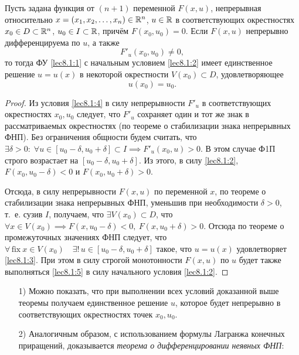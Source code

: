 \documentclass[../../main.tex]{subfiles}
\begin{document}
	 \begin{thm}
		Пусть задана функция от $(n+1)$ переменной $F(x, u)$, непрерывная 
		относительно $x = (x_1, x_2, \ldots,
	 	x_n) \in \mathbb{R}^n$, $u \in \mathbb{R}$ в соответствующих окрестностях $x_0 \in D 
	 	\subset \mathbb{R}^n$, $u_0 \in I \subset \mathbb{R}$, причём $F(x_0,u_0)=0$. Если $F(x,u)$ 
	 	непрерывно дифференцируема по $u$, а также 
		\begin{equation}
			F'_u(x_0, u_0) \ne 0, \label{lec8.1:4}
		\end{equation}
		то тогда ФУ \eqref{lec8.1:1} с начальным условием \eqref{lec8.1:2} имеет 
		единственное решение $u = u(x)$ в некоторой окрестности $V(x_0) 
		\subset D$, удовлетворяющее
	 	\begin{equation}
			u(x_0) = u_0. \label{lec8.1:5}
		\end{equation}
	 \end{thm}
	 \begin{proof}
		 Из условия \eqref{lec8.1:4} в силу непрерывности $F'_u$ в 
		 соответствующих окрестностях $x_0, u_0$ следует, что $F'_u$ сохраняет 
		 один и тот же знак в рассматриваемых окрестностях (по теореме о 
		 стабилизации знака непрерывных ФНП). Без ограничения общности 
		 будем считать, что $\exists \delta > 0: \; 
		 \forall u \in [u_0 - \delta, 
		 u_0 + \delta] \subset I \implies F'_u(x_0, u)>0$. В этом случае Ф1П
		 строго возрастает на $[u_0 - \delta, u_0 + \delta]$. Из этого, в силу 
		 \eqref{lec8.1:2}, $F(x_0, u_0 - \delta) < 0$ и
		 $ F(x_0, u_0 + \delta) > 0$.

		 Отсюда, в силу непрерывности
		 $F(x,u)$ по переменной $x$, по теореме о стабилизации  знака непрерывных 
		 ФНП, 
		 уменьшив при необходимости
		 $\delta > 0$, т.~е. сузив $I$, получаем, что $\exists V(x_0) 
		 \subset D$, что $\forall x \in V(x_0) \implies F(x, u_0 - 
		 \delta) < 0,\ F(x, u_0 + \delta) > 0$. Отсюда по теореме о промежуточных 
		 значениях ФНП следует, что $\forall\, \text{fix} 
		 \: x \in V(x_0) \quad \exists! \,
		 u \in [u_0 - \delta, u_0 + \delta]$ такое, что $u = u(x)$ удовлетворяет 
		 \eqref{lec8.1:3}. При этом в силу строгой монотонности $F(x, u)$ по $u$ 
		 будет также выполняться \eqref{lec8.1:5} в силу начального условия 
		 \eqref{lec8.1:2}. 
	 \end{proof}

	 \begin{rems}
	 \;
		 \begin{itemize}
		 	 \item[1)] Можно показать, что при выполнении всех условий 
		 	 доказанной выше теоремы получаем единственное решение $u$, 
		 	 которое будет непрерывно в соответствующих окрестностях точек 
		 	 $x_0, u_0$.

			 \item[2)] Аналогичным образом, с использованием формулы Лагранжа 
			 конечных приращений, доказывается \emph{теорема о 
			 дифференцировании неявных ФНП}:
		\end{itemize}
	\end{rems}
\end{document}
